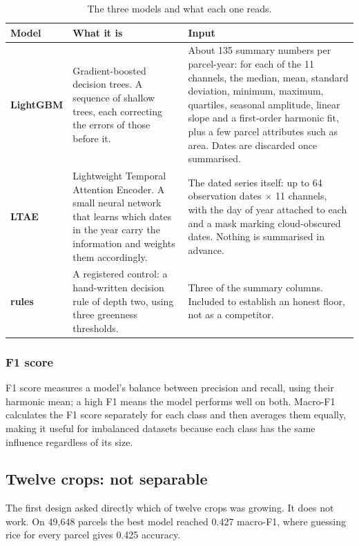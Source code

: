 \documentclass[11pt,a4paper]{article}
\begin{document}
\begin{table}[htbp]
\centering
\small
\caption{The three models and what each one reads.}
\label{tab:models}
\begin{tabular}{@{}p{2.4cm}p{5.2cm}p{6.8cm}@{}}
\toprule
\textbf{Model} & \textbf{What it is} & \textbf{Input} \\
\midrule
\textbf{LightGBM}
& Gradient-boosted decision trees. A sequence of shallow trees, each correcting the errors of
those before it.
& About 135 summary numbers per parcel-year: for each of the 11 channels, the median, mean,
standard deviation, minimum, maximum, quartiles, seasonal amplitude, linear slope and a
first-order harmonic fit, plus a few parcel attributes such as area. Dates are discarded once
summarised. \\[0.4em]

\textbf{LTAE}
& Lightweight Temporal Attention Encoder. A small neural network that learns which dates in the
year carry the information and weights them accordingly.
& The dated series itself: up to 64 observation dates $\times$ 11 channels, with the day of year
attached to each and a mask marking cloud-obscured dates. Nothing is summarised in advance. \\[0.4em]

\textbf{rules}
& A registered control: a hand-written decision rule of depth two, using three greenness
thresholds.
& Three of the summary columns. Included to establish an honest floor, not as a competitor. \\
\bottomrule
\end{tabular}
\end{table}

\subsubsection{F1 score}
F1 score measures a model’s balance between precision and recall, using their harmonic mean; a high F1 means the model performs well on both.
Macro-F1 calculates the F1 score separately for each class and then averages them equally, making it useful for imbalanced datasets because each class has the same influence regardless of its size.

\subsection{Twelve crops: not separable}

The first design asked directly which of twelve crops was growing. It does not work. On 49{,}648
parcels the best model reached 0.427 macro-F1, where guessing rice for every parcel gives 0.425
accuracy.
\end{document}
